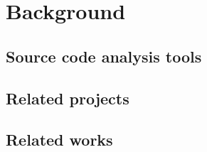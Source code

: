 \section{Background}
\label{sec:background}

\subsection{Source code analysis tools}
\label{subsec:related-tools}


\subsection{Related projects}
\label{subsec:related-projects}


\subsection{Related works}
\label{sec:related-works}


